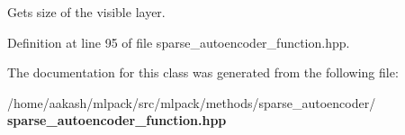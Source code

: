 Gets size of the visible layer. 



Definition at line 95 of file sparse\+\_\+autoencoder\+\_\+function.\+hpp.



The documentation for this class was generated from the following file\+:\begin{DoxyCompactItemize}
\item 
/home/aakash/mlpack/src/mlpack/methods/sparse\+\_\+autoencoder/\textbf{ sparse\+\_\+autoencoder\+\_\+function.\+hpp}\end{DoxyCompactItemize}
